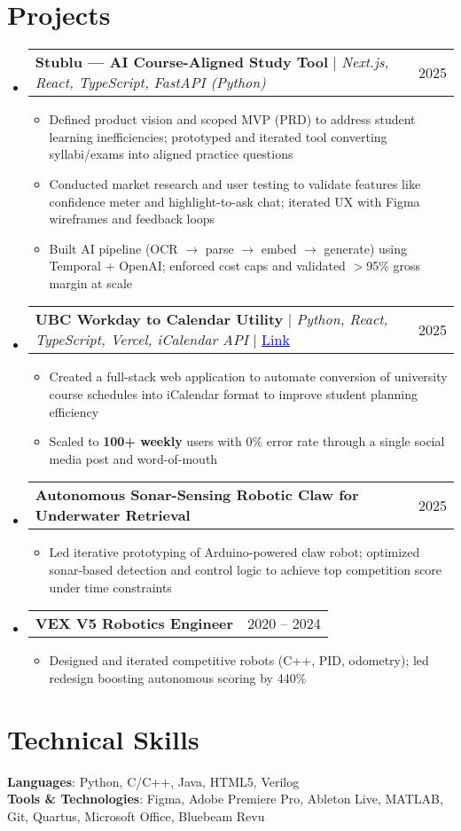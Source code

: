 \documentclass[letterpaper,11pt]{article}
\makeatletter
\newcommand{\resumeItem}[1]{
  \item\small{
    {#1 \vspace{-2pt}}
  }
}
\newcommand{\resumeProjectHeading}[2]{
    \item
    \begin{tabular*}{0.97\textwidth}{l@{\extracolsep{\fill}}r}
      \small#1 & #2 \\
    \end{tabular*}\vspace{-7pt}
}
\newcommand{\resumeSubHeadingListStart}{\begin{itemize}[leftmargin=0.15in, label={}]}
\newcommand{\resumeSubHeadingListEnd}{\end{itemize}}
\newcommand{\resumeItemListStart}{\begin{itemize}}
\newcommand{\resumeItemListEnd}{\end{itemize}\vspace{-7pt}}
\makeatother
\begin{document}
\section{Projects}
    \resumeSubHeadingListStart
      \resumeProjectHeading
        {\textbf{Stublu — AI Course-Aligned Study Tool} $|$ \textit{Next.js, React, TypeScript, FastAPI (Python)}}{2025}
        \resumeItemListStart
          \resumeItem{Defined product vision and scoped MVP (PRD) to address student learning inefficiencies; prototyped and iterated tool converting syllabi/exams into aligned practice questions}
          \resumeItem{Conducted market research and user testing to validate features like confidence meter and highlight-to-ask chat; iterated UX with Figma wireframes and feedback loops}
          \resumeItem{Built AI pipeline (OCR $\rightarrow$ parse $\rightarrow$ embed $\rightarrow$ generate) using Temporal + OpenAI; enforced cost caps and validated $>$95\% gross margin at scale}
        \resumeItemListEnd

      \resumeProjectHeading
        {\textbf{UBC Workday to Calendar Utility} $|$ \textit{Python, React, TypeScript, Vercel, iCalendar API} $|$ \href{https://ubcworkdaycalendartool.vercel.app/}{\textcolor{blue}{Link}}}{2025}
        \resumeItemListStart
          \resumeItem{Created a full-stack web application to automate conversion of university course schedules into iCalendar format to improve student planning efficiency}
          \resumeItem{Scaled to \textbf{100+ weekly} users with 0\% error rate through a single social media post and word-of-mouth}
        \resumeItemListEnd

      \resumeProjectHeading
        {\textbf{Autonomous Sonar-Sensing Robotic Claw for Underwater Retrieval}}{2025}
        \resumeItemListStart
          \resumeItem{Led iterative prototyping of Arduino-powered claw robot; optimized sonar-based detection and control logic to achieve top competition score under time constraints}
        \resumeItemListEnd

      \resumeProjectHeading
        {\textbf{VEX V5 Robotics Engineer}}{2020 -- 2024}
        \resumeItemListStart
          \resumeItem{Designed and iterated competitive robots (C++, PID, odometry); led redesign boosting autonomous scoring by 440\%}
        \resumeItemListEnd
    \resumeSubHeadingListEnd

\section{Technical Skills}
  \begin{itemize}[leftmargin=0.15in, label={}]
    \small{\item{
     \textbf{Languages}{: Python, C/C++, Java, HTML5, Verilog} \\
     \textbf{Tools \& Technologies}{: Figma, Adobe Premiere Pro, Ableton Live, MATLAB, Git, Quartus, Microsoft Office, Bluebeam Revu}
    }}
  \end{itemize}
\end{document}
